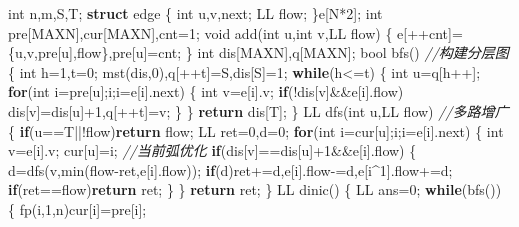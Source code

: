 \documentclass[
]{article}
\newenvironment{Shaded}{}{}
\newcommand{\CommentTok}[1]{\textcolor[rgb]{0.38,0.63,0.69}{\textit{#1}}}
\newcommand{\ControlFlowTok}[1]{\textcolor[rgb]{0.00,0.44,0.13}{\textbf{#1}}}
\newcommand{\DataTypeTok}[1]{\textcolor[rgb]{0.56,0.13,0.00}{#1}}
\newcommand{\DecValTok}[1]{\textcolor[rgb]{0.25,0.63,0.44}{#1}}
\newcommand{\KeywordTok}[1]{\textcolor[rgb]{0.00,0.44,0.13}{\textbf{#1}}}
\newcommand{\NormalTok}[1]{#1}
\begin{document}
\begin{Shaded}
\begin{Highlighting}[]
\DataTypeTok{int}\NormalTok{ n,m,S,T;}
\KeywordTok{struct}\NormalTok{ edge}
\NormalTok{\{}
    \DataTypeTok{int}\NormalTok{ u,v,next;}
\NormalTok{    LL flow;}
\NormalTok{\}e[N*}\DecValTok{2}\NormalTok{];}
\DataTypeTok{int}\NormalTok{ pre[MAXN],cur[MAXN],cnt=}\DecValTok{1}\NormalTok{;}
\DataTypeTok{void}\NormalTok{ add(}\DataTypeTok{int}\NormalTok{ u,}\DataTypeTok{int}\NormalTok{ v,LL flow)}
\NormalTok{\{}
\NormalTok{    e[++cnt]=\{u,v,pre[u],flow\},pre[u]=cnt;}
\NormalTok{\}}
\DataTypeTok{int}\NormalTok{ dis[MAXN],q[MAXN];}
\DataTypeTok{bool}\NormalTok{ bfs() }\CommentTok{//构建分层图}
\NormalTok{\{}
    \DataTypeTok{int}\NormalTok{ h=}\DecValTok{1}\NormalTok{,t=}\DecValTok{0}\NormalTok{;}
\NormalTok{    mst(dis,}\DecValTok{0}\NormalTok{),q[++t]=S,dis[S]=}\DecValTok{1}\NormalTok{;}
    \ControlFlowTok{while}\NormalTok{(h\textless{}=t)}
\NormalTok{    \{}
        \DataTypeTok{int}\NormalTok{ u=q[h++];}
        \ControlFlowTok{for}\NormalTok{(}\DataTypeTok{int}\NormalTok{ i=pre[u];i;i=e[i].next)}
\NormalTok{        \{}
            \DataTypeTok{int}\NormalTok{ v=e[i].v;}
            \ControlFlowTok{if}\NormalTok{(!dis[v]\&\&e[i].flow)}
\NormalTok{                dis[v]=dis[u]+}\DecValTok{1}\NormalTok{,q[++t]=v;}
\NormalTok{        \}}
\NormalTok{    \}}
    \ControlFlowTok{return}\NormalTok{ dis[T];}
\NormalTok{\}}
\NormalTok{LL dfs(}\DataTypeTok{int}\NormalTok{ u,LL flow) }\CommentTok{//多路增广}
\NormalTok{\{}
    \ControlFlowTok{if}\NormalTok{(u==T||!flow)}\ControlFlowTok{return}\NormalTok{ flow;}
\NormalTok{    LL ret=}\DecValTok{0}\NormalTok{,d=}\DecValTok{0}\NormalTok{;}
    \ControlFlowTok{for}\NormalTok{(}\DataTypeTok{int}\NormalTok{ i=cur[u];i;i=e[i].next)}
\NormalTok{    \{}
        \DataTypeTok{int}\NormalTok{ v=e[i].v; cur[u]=i; }\CommentTok{//当前弧优化}
        \ControlFlowTok{if}\NormalTok{(dis[v]==dis[u]+}\DecValTok{1}\NormalTok{\&\&e[i].flow)}
\NormalTok{        \{}
\NormalTok{            d=dfs(v,min(flow{-}ret,e[i].flow));}
            \ControlFlowTok{if}\NormalTok{(d)ret+=d,e[i].flow{-}=d,e[i\^{}}\DecValTok{1}\NormalTok{].flow+=d;}
            \ControlFlowTok{if}\NormalTok{(ret==flow)}\ControlFlowTok{return}\NormalTok{ ret;}
\NormalTok{        \}}
\NormalTok{    \}}
    \ControlFlowTok{return}\NormalTok{ ret;}
\NormalTok{\}}
\NormalTok{LL dinic()}
\NormalTok{\{}
\NormalTok{    LL ans=}\DecValTok{0}\NormalTok{;}
    \ControlFlowTok{while}\NormalTok{(bfs())}
\NormalTok{    \{}
\NormalTok{        fp(i,}\DecValTok{1}\NormalTok{,n)cur[i]=pre[i];}

\end{Highlighting}
\end{Shaded}
\end{document}
